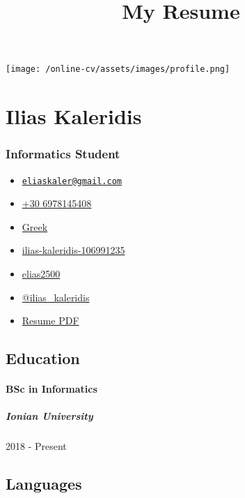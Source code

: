 \documentclass[english,]{article}
\title{My Resume}
\date{}
\providecommand{\tightlist}{%
  \setlength{\itemsep}{0pt}\setlength{\parskip}{0pt}}
\let\oldparagraph\paragraph
\renewcommand{\paragraph}[1]{\oldparagraph{#1}\mbox{}}
\let\oldsubparagraph\subparagraph
\renewcommand{\subparagraph}[1]{\oldsubparagraph{#1}\mbox{}}
\begin{document}
\maketitle

\texttt{[image: /online-cv/assets/images/profile.png]}

\hypertarget{ilias-kaleridis}{%
\section{Ilias Kaleridis}\label{ilias-kaleridis}}

\hypertarget{informatics-student}{%
\subsubsection{Informatics Student}\label{informatics-student}}

\begin{itemize}
\tightlist
\item
  \emph{}
  \href{mailto:eliaskaler@gmail.com}{\nolinkurl{eliaskaler@gmail.com}}
\item
  \emph{} \href{tel:+30\%206978145408}{+30 6978145408}
\item
  \emph{} \href{}{Greek}
\item
  \emph{}
  \href{https://linkedin.com/in/ilias-kaleridis-106991235}{ilias-kaleridis-106991235}
\item
  \emph{} \href{http://github.com/elias2500}{elias2500}
\item
  \emph{} \href{https://twitter.com/@ilias_kaleridis}{@ilias\_kaleridis}
\item
  \emph{} \href{/pdf/index.pdf/}{Resume PDF}
\end{itemize}

\hypertarget{education}{%
\subsection{Education}\label{education}}

\hypertarget{bsc-in-informatics}{%
\paragraph{BSc in Informatics}\label{bsc-in-informatics}}

\hypertarget{ionian-university}{%
\subparagraph{Ionian University}\label{ionian-university}}

2018 - Present

\hypertarget{languages}{%
\subsection{Languages}\label{languages}}
\end{document}
